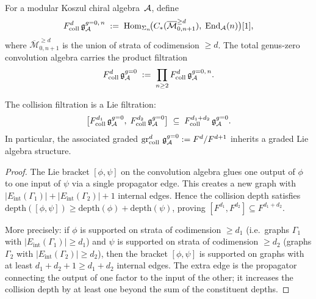 \begin{definition}
For a modular Koszul chiral algebra~$\mathcal{A}$, define
\begin{equation}%
F^d_{\mathrm{coll}}\,
\mathfrak{g}^{g{=}0,\,n}_\cA
\;:=\;
\Hom_{\Sigma_n}\!\bigl(
 C_*(\overline{\mathcal{M}}_{0,n+1}^{\geq d}),\;
 \End_\cA(n)
\bigr)[1],
\end{equation}
where $\overline{\mathcal{M}}_{0,n+1}^{\geq d}$ is the union of
strata of codimension $\geq d$. The total genus-zero convolution
algebra carries the product filtration
\begin{equation}%
F^d_{\mathrm{coll}}\,
\mathfrak{g}^{g{=}0}_\cA
\;:=\;
\prod_{n \geq 2}
F^d_{\mathrm{coll}}\,
\mathfrak{g}^{g{=}0,\,n}_\cA.
\end{equation}
\end{definition}

\begin{lemma}
\label{lem:thqg-V-collision-lie-compatibility}
The collision filtration is a Lie filtration:
\begin{equation}%
\bigl[
 F^{d_1}_{\mathrm{coll}}\,\mathfrak{g}^{g{=}0}_\cA,\;
 F^{d_2}_{\mathrm{coll}}\,\mathfrak{g}^{g{=}0}_\cA
\bigr]
\;\subseteq\;
F^{d_1+d_2}_{\mathrm{coll}}\,\mathfrak{g}^{g{=}0}_\cA.
\end{equation}
In particular, the associated graded
$\operatorname{gr}_{\mathrm{coll}}^d\,\mathfrak{g}^{g{=}0}_{\mathcal{A}}
:= F^d / F^{d+1}$
inherits a graded Lie algebra structure.
\end{lemma}

\begin{proof}
The Lie bracket $[\phi, \psi]$ on the convolution algebra glues one
output of $\phi$ to one input of $\psi$ via a single propagator edge.
This creates a new graph with
$|E_{\mathrm{int}}(\Gamma_1)| + |E_{\mathrm{int}}(\Gamma_2)| + 1$
internal edges. Hence the collision depth satisfies
$\mathrm{depth}([\phi,\psi]) \geq \mathrm{depth}(\phi) + \mathrm{depth}(\psi)$,
proving $[F^{d_1}, F^{d_2}] \subseteq F^{d_1 + d_2}$.

More precisely: if $\phi$ is supported on strata of codimension
$\geq d_1$ (i.e.\ graphs $\Gamma_1$ with
$|E_{\mathrm{int}}(\Gamma_1)| \geq d_1$) and $\psi$ is supported
on strata of codimension $\geq d_2$ (graphs $\Gamma_2$ with
$|E_{\mathrm{int}}(\Gamma_2)| \geq d_2$), then the bracket
$[\phi,\psi]$ is supported on graphs with at least
$d_1 + d_2 + 1 \geq d_1 + d_2$ internal edges. The extra
edge is the propagator connecting the output of one factor to the
input of the other; it increases the collision depth by at least one
beyond the sum of the constituent depths.
\end{proof}

